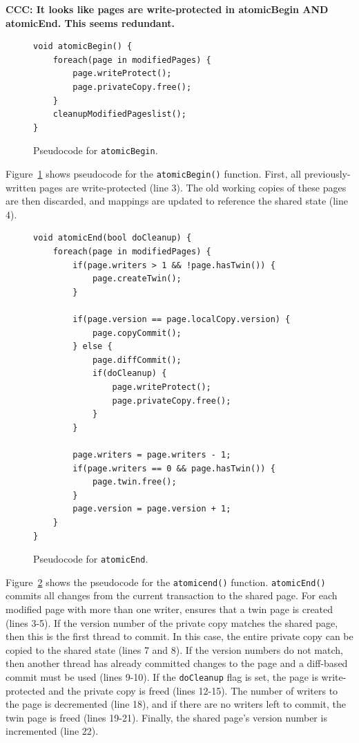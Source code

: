 \textbf{CCC: It looks like pages are write-protected in atomicBegin AND atomicEnd.  This seems redundant.}

\begin{figure}[!ht]
\begin{lstlisting}
void atomicBegin() {
	foreach(page in modifiedPages) {
		page.writeProtect();
		page.privateCopy.free();
	}
	cleanupModifiedPageslist(); 
}
\end{lstlisting}
\caption{Pseudocode for \texttt{atomicBegin}.\label{fig:atomicbegin}}
\end{figure}

\label{sec:atomicbegin}

Figure~\ref{fig:atomicbegin} shows pseudocode for the \texttt{atomicBegin()} function.   First, all previously-written pages are write-protected (line 3).  The old working copies of these pages are then discarded, and mappings are updated to reference the shared state (line 4).

\begin{figure}[!ht]
\begin{lstlisting}
void atomicEnd(bool doCleanup) {
	foreach(page in modifiedPages) {
		if(page.writers > 1 && !page.hasTwin()) {
			page.createTwin();
		}

		if(page.version == page.localCopy.version) {
			page.copyCommit();
		} else {
			page.diffCommit();
			if(doCleanup) {
				page.writeProtect();
				page.privateCopy.free();
			}
		}

		page.writers = page.writers - 1;
		if(page.writers == 0 && page.hasTwin()) { 
			page.twin.free();
		}
		page.version = page.version + 1;
	}
}
\end{lstlisting}
\caption{Pseudocode for \texttt{atomicEnd}.\label{fig:atomicend}}
\end{figure}

Figure~\ref{fig:atomicend} shows the pseudocode for the \texttt{atomicend()} function.  \texttt{atomicEnd()} commits all changes from the current transaction to the shared page.  For each modified page with more than one writer, \dthreads{} ensures that a twin page is created (lines 3-5).  If the version number of the private copy matches the shared page, then this is the first thread to commit.  In this case, the entire private copy can be copied to the shared state (lines 7 and 8).  If the version numbers do not match, then another thread has already committed changes to the page and a diff-based commit must be used (lines 9-10).  If the \texttt{doCleanup} flag is set, the page is write-protected and the private copy is freed (lines 12-15).  The number of writers to the page is decremented (line 18), and if there are no writers left to commit, the twin page is freed (lines 19-21).  Finally, the shared page's version number is incremented (line 22).

